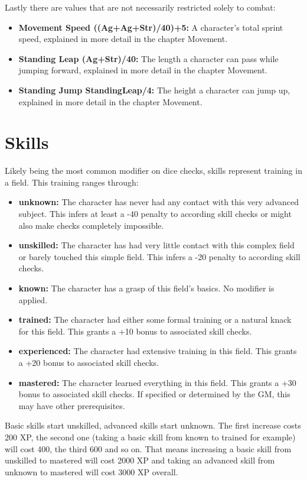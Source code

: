 \documentclass[12pt,a4paper,openany]{book}
\begin{document}
	Lastly there are values that are not necessarily restricted solely to combat:
	\begin{itemize}
		\setlength\itemsep{-8mm}
		\item \textbf{Movement Speed \textlangle((Ag+Ag+Str)/40)+5\textrangle:} A character’s total sprint speed, explained in more detail in the chapter Movement.
		\item \textbf{Standing Leap \textlangle(Ag+Str)/40\textrangle:} The length a character can pass while jumping forward, explained in more detail in the chapter Movement.
		\item \textbf{Standing Jump \textlangle StandingLeap/4\textrangle:} The height a character can jump up, explained in more detail in the chapter Movement.
	\end{itemize}
	\section{Skills}
	Likely being the most common modifier on dice checks, skills represent training in a field. This training ranges through:
	\begin{itemize}
		\setlength\itemsep{-8mm}
		\item \textbf{unknown:} The character has never had any contact with this very advanced subject. This infers at least a -40 penalty to according skill checks or might also make checks completely impossible.
		\item \textbf{unskilled:} The character has had very little contact with this complex field or barely touched this simple field. This infers a -20 penalty to according skill checks.
		\item \textbf{known:} The character has a grasp of this field’s basics. No modifier is applied.
		\item \textbf{trained:} The character had either some formal training or a natural knack for this field. This grants a +10 bonus to associated skill checks.
		\item \textbf{experienced:} The character had extensive training in this field. This grants a +20 bonus to associated skill checks.
		\item \textbf{mastered:} The character learned everything in this field. This grants a +30 bonus to associated skill checks. If specified or determined by the GM, this may have other prerequisites. 
	\end{itemize}
	Basic skills start unskilled, advanced skills start unknown. The first increase costs 200 XP, the second one (taking a basic skill from known to trained for example) will cost 400, the third 600 and so on. That means increasing a basic skill from unskilled to mastered will cost 2000 XP and taking an advanced skill from unknown to mastered will cost 3000 XP overall.
\end{document}

